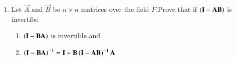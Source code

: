 \renewcommand{\theequation}{\theenumi}
\renewcommand{\thefigure}{\theenumi}
\begin{enumerate}[label=\thesubsection.\arabic*.,ref=\thesubsection.\theenumi]


\item Let $\vec{A}$ and $\vec{B}$ be $n\times n$ matrices over the field $F$.Prove that if $\left(\mathbf{I}-\mathbf{A}\mathbf{B}\right)$ is invertibe
\begin{enumerate}
    \item $\left(\mathbf{I}-\mathbf{B}\mathbf{A}\right)$ is invertible and
    \item $\left(\mathbf{I}-\mathbf{B}\mathbf{A}\right)^{-1}=\mathbf{I}+\mathbf{B}\left(\mathbf{I}-\mathbf{A}\mathbf{B}\right)^{-1}\mathbf{A}$
\end{enumerate}
%
\solution
%
\end{enumerate}
